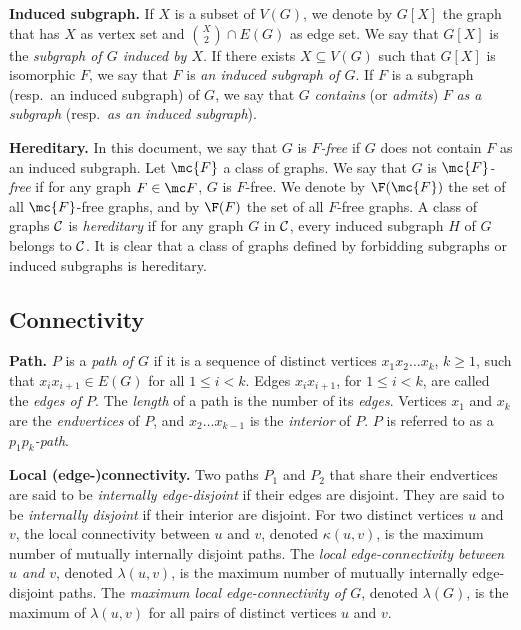 \medskip

\textbf{Induced subgraph.}
If $X$ is a subset of $V(G)$, we denote by $G[X]$ the graph that has $X$ as vertex set and ${X \choose 2} \cap E(G)$ as edge set. 
We say that $G[X]$ is the \emph{subgraph of $G$ induced by $X$}. 
If there exists  $X  \subseteq V(G)$ such that $G[X]$ is isomorphic $F$, we say that $F$ is \textit{an induced subgraph of $G$}.
If $F$ is a subgraph (resp.\ an induced subgraph) of $G$, we say that $G$ \textit{contains} (or \textit{admits}) $F$ \textit{as a subgraph} (resp.\ \textit{as an induced subgraph}). 

\medskip

\textbf{Hereditary.}
In this document, we say that $G$ is  \emph{$F$-free} if $G$ does not contain $F$ as an induced subgraph.
Let $\mc{F}$ a class of graphs. We say that $G$ is $\mc{F}$\emph{-free} if for any graph $F \in \mc F$, $G$ is $F$-free.
We denote by $\F(\mc{F})$ the set of all $\mc{F}$-free graphs, and by $\F(F)$ the set of all $F$-free graphs.
 A class of graphs $\cal C$ is \textit{hereditary} if for any graph $G$ in $\cal C$, every induced subgraph $H$ of $G$ belongs to $\cal C$. 
It is clear that a class of graphs defined by forbidding subgraphs or induced subgraphs is hereditary.


\subsection{Connectivity}

\textbf{Path.}
$P$ is a {\em path of $G$} if it is a sequence of distinct vertices $x_1x_2\ldots x_k$,
$k\geq 1$, such that $x_ix_{i+1} \in E(G)$ for all $1\leq i < k$.
Edges $x_ix_{i+1}$,  for  $1\leq i < k$, are called the {\em edges of $P$}.
The \emph{length} of a path is the number of its \emph{edges}.
Vertices $x_1$ and $x_k$ are the {\em endvertices} of $P$, and 
$x_2\ldots x_{k-1}$ is the {\em interior} of $P$.
$P$ is referred to as a {\em $p_1p_k$-path}.

\medskip

\textbf{Local (edge-)connectivity.}
Two paths $P_1$ and $P_2$ that share their endvertices are said to be \emph{internally edge-disjoint} if their edges are disjoint. They are said to be \emph{internally disjoint} if their interior are disjoint. For two distinct vertices $u$ and $v$, the local connectivity between $u$ and $v$, denoted $\kappa(u,v)$, is the maximum number of mutually internally disjoint paths.  The \emph{local edge-connectivity between $u$ and $v$}, denoted $\lambda(u,v)$, is the maximum number of mutually internally edge-disjoint paths. The \emph{maximum local edge-connectivity of $G$}, denoted $\lambda(G)$, is the maximum of $\lambda(u,v)$ for all pairs of distinct vertices $u$ and $v$.

